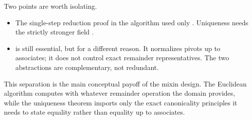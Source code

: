 Two points are worth isolating.

\begin{itemize}
  \item The single-step reduction proof in the algorithm used only
    . Uniqueness needs the strictly stronger field
    .
  \item {} is still essential, but for a different
    reason. It normalizes pivots up to associates; it does not control exact
    remainder representatives. The two abstractions are complementary, not
    redundant.
\end{itemize}

This separation is the main conceptual payoff of the mixin design. The Euclidean
algorithm computes with whatever remainder operation the domain provides, while
the uniqueness theorem imports only the exact canonicality principles it needs to
state equality rather than equality up to associates.
